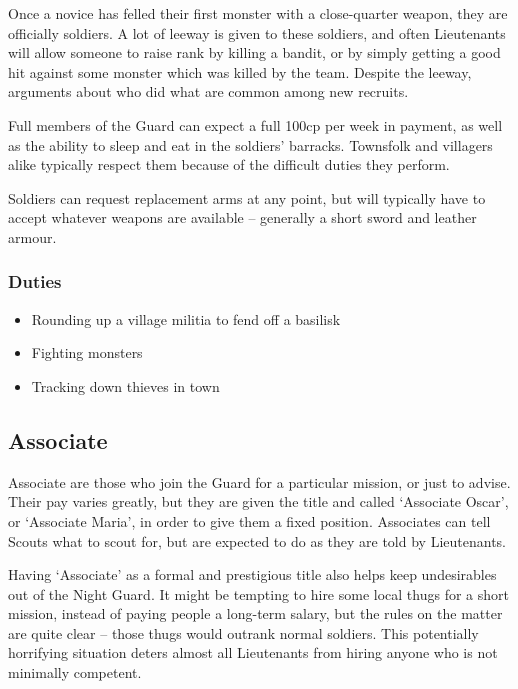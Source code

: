 \begin{multicols}{2}
Once a novice has felled their first monster with a close-quarter weapon, they are officially soldiers.
A lot of leeway is given to these soldiers, and often Lieutenants will allow someone to raise rank by killing a bandit, or by simply getting a good hit against some monster which was killed by the team.
Despite the leeway, arguments about who did what are common among new recruits.

Full members of the Guard can expect a full 100cp per week in payment, as well as the ability to sleep and eat in the soldiers' barracks.
Townsfolk and villagers alike typically respect them because of the difficult duties they perform.

Soldiers can request replacement arms at any point, but will typically have to accept whatever weapons are available -- generally a short sword and leather armour.

\subsubsection{Duties}

\begin{itemize}

	\item{Rounding up a village militia to fend off a basilisk}
	\item{Fighting monsters}
	\item{Tracking down thieves in town}
\end{itemize}

\subsection{Associate}

Associate are those who join the Guard for a particular mission, or just to advise.
Their pay varies greatly, but they are given the title and called `Associate Oscar', or `Associate Maria', in order to give them a fixed position.
Associates can tell Scouts what to scout for, but are expected to do as they are told by Lieutenants.

Having `Associate' as a formal and prestigious title also helps keep undesirables out of the Night Guard.
It might be tempting to hire some local thugs for a short mission, instead of paying people a long-term salary, but the rules on the matter are quite clear -- those thugs would outrank normal soldiers.
This potentially horrifying situation deters almost all Lieutenants from hiring anyone who is not minimally competent.


\end{multicols}

